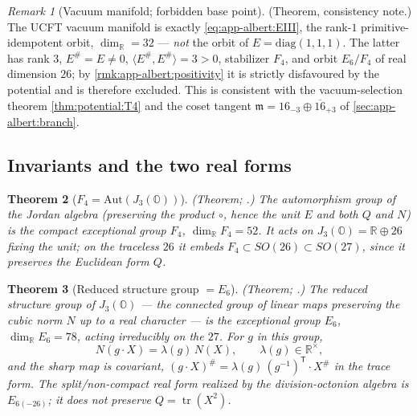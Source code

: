 \documentclass[11pt]{article}
\theoremstyle{plain}
\newtheorem{theorem}{Theorem}[section]
\theoremstyle{definition}
\theoremstyle{remark}
\newtheorem{remark}[theorem]{Remark}
\begin{document}
\begin{remark}[Vacuum manifold; forbidden base point]\label{rmk:app-albert:vacuum}
\textup{(Theorem, consistency note.)}
The UCFT vacuum manifold is exactly \eqref{eq:app-albert:EIII}, the rank-$1$
primitive-idempotent orbit, $\dim_{\mathbb R}=32$ --- \emph{not} the orbit of
$E=\mathrm{diag}(1,1,1)$. The latter has rank $3$, $E^\#=E\neq0$,
$\langle E^\#,E^\#\rangle=3>0$, stabilizer $F_4$, and orbit $E_6/F_4$ of real
dimension $26$; by \autoref{rmk:app-albert:positivity} it is strictly disfavoured
by the potential and is therefore excluded. This is consistent with the
vacuum-selection theorem \autoref{thm:potential:T4} and the coset tangent
$\mathfrak m=16_{-3}\oplus\overline{16}_{+3}$ of \autoref{sec:app-albert:branch}.
\end{remark}

\subsection{Invariants and the two real forms}
\label{sec:app-albert:invariants}
\label{sec:app-albert:F4E6}

\begin{theorem}[$F_4=\mathrm{Aut}(J_3(\mathbb O))$]\label{thm:app-albert:F4}
\textup{(Theorem; \cite{Schafer:1966,Yokota:2009}.)}
The automorphism group of the Jordan algebra (preserving the product $\circ$,
hence the unit $E$ and \emph{both} $Q$ and $N$) is the compact exceptional group
$F_4$, $\dim_{\mathbb R}F_4=52$. It acts on $J_3(\mathbb O)=\mathbb R\oplus 26$
fixing the unit; on the traceless $26$ it embeds $F_4\subset SO(26)\subset
SO(27)$, since it preserves the Euclidean form $Q$.
\end{theorem}

\begin{theorem}[Reduced structure group $=E_6$]\label{thm:app-albert:E6}
\textup{(Theorem; \cite{Jacobson:1968,Springer:2000}.)}
The \emph{reduced structure group} of $J_3(\mathbb O)$ --- the connected group of
linear maps preserving the cubic norm $N$ up to a real character --- is the
exceptional group $E_6$, $\dim_{\mathbb R}E_6=78$, acting irreducibly on the $27$.
For $g$ in this group,
\begin{equation}\label{eq:app-albert:character}
  N(g\cdot X)=\lambda(g)\,N(X),\qquad \lambda(g)\in\mathbb R^\times,
\end{equation}
and the sharp map is covariant, $(g\cdot X)^\#=\lambda(g)\,(g^{-1})^{\mathsf T}\!
\cdot X^\#$ in the trace form. The split/non-compact real form realized by the
\emph{division}-octonion algebra is $E_{6(-26)}$; it does \emph{not} preserve
$Q=\operatorname{tr}(X^2)$.
\end{theorem}
\end{document}
